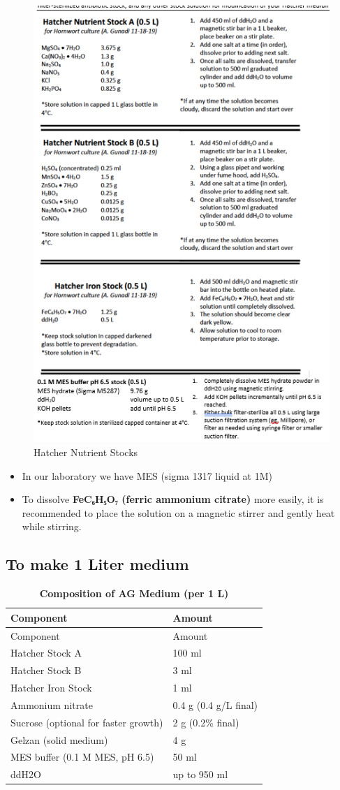 \documentclass[
  11pt,
]{article}
\providecommand{\tightlist}{%
  \setlength{\itemsep}{0pt}\setlength{\parskip}{0pt}}
\begin{document}
\begin{figure}

{\centering \includegraphics[width=0.6\linewidth]{Figuras/Stock} 

}

\caption{Hatcher Nutrient Stocks}\label{fig:unnamed-chunk-1}
\end{figure}

\begin{itemize}
\tightlist
\item
  In our laboratory we have MES (sigma 1317 liquid at 1M)
\item
  To dissolve \textbf{FeC₆H₅O₇ (ferric ammonium citrate)} more easily,
  it is recommended to place the solution on a magnetic stirrer and
  gently heat while stirring.
\end{itemize}

\subsection{To make 1 Liter medium}\label{to-make-1-liter-medium}

\begin{longtable}[]{@{}ll@{}}
\caption{\textbf{Composition of AG Medium (per 1 L)}}\tabularnewline
\toprule\noalign{}
Component & Amount \\
\midrule\noalign{}
\endfirsthead
\toprule\noalign{}
Component & Amount \\
\midrule\noalign{}
\endhead
\bottomrule\noalign{}
\endlastfoot
Hatcher Stock A & 100 ml \\
Hatcher Stock B & 3 ml \\
Hatcher Iron Stock & 1 ml \\
Ammonium nitrate & 0.4 g (0.4 g/L final) \\
Sucrose (optional for faster growth) & 2 g (0.2\% final) \\
Gelzan (solid medium) & 4 g \\
MES buffer (0.1 M MES, pH 6.5) & 50 ml \\
ddH2O & up to 950 ml \\
\end{longtable}
\end{document}
